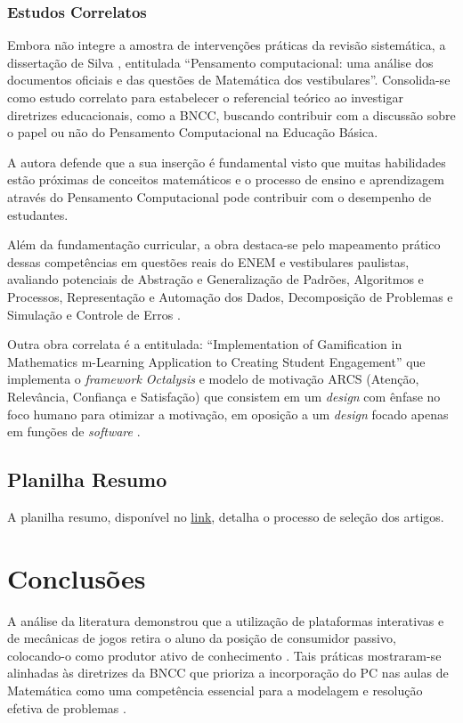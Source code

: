 \documentclass[12pt]{article}
\begin{document}
\subsubsection{Estudos Correlatos}
Embora não integre a amostra de intervenções práticas da revisão sistemática, a dissertação de Silva \cite{silva2020}, entitulada ``Pensamento computacional: uma análise dos documentos oficiais e das questões de Matemática dos vestibulares''. Consolida-se como estudo correlato para estabelecer o referencial teórico ao investigar diretrizes educacionais, como a BNCC, buscando contribuir com a discussão sobre o papel ou não do Pensamento Computacional na Educação Básica\cite{silva2020}.

A autora defende que a sua inserção é fundamental visto que muitas habilidades estão próximas de conceitos matemáticos e o processo de ensino e aprendizagem através do Pensamento Computacional pode contribuir com o desempenho de estudantes\cite{silva2020}. 

Além da fundamentação curricular, a obra destaca-se pelo mapeamento prático dessas competências em questões reais do ENEM e vestibulares paulistas, avaliando potenciais de Abstração e Generalização de Padrões, Algoritmos e Processos, Representação e Automação dos Dados, Decomposição de Problemas e Simulação e Controle de Erros \cite{silva2020}. 

Outra obra correlata é a entitulada: ``Implementation of Gamification in Mathematics m-Learning Application to Creating Student Engagement'' que implementa o \textit{framework Octalysis} e modelo de motivação ARCS (Atenção, Relevância, Confiança e Satisfação)  que consistem em um \textit{design} com ênfase no foco humano para otimizar a motivação, em oposição a um \textit{design} focado apenas em funções de \textit{software} \cite{atin2022}.

\subsection{Planilha Resumo}
A planilha resumo, disponível no \href{https://docs.google.com/spreadsheets/d/1CgtnSKOGnxReo3wmmx0hDnhYqoKaHWd_DOiXrkOBRdQ/edit?usp=sharing}{link}, detalha o processo de seleção dos artigos.
\newpage
\section{Conclusões}

A análise da literatura demonstrou que a utilização de plataformas interativas e de mecânicas de jogos retira o aluno da posição de consumidor passivo, colocando-o como produtor ativo de conhecimento \cite{bessa2020, filho2025}. Tais práticas mostraram-se alinhadas às diretrizes da BNCC que prioriza a incorporação do PC nas aulas de Matemática como uma competência essencial para a modelagem e resolução efetiva de problemas \cite{brasil2017}.
\end{document}
